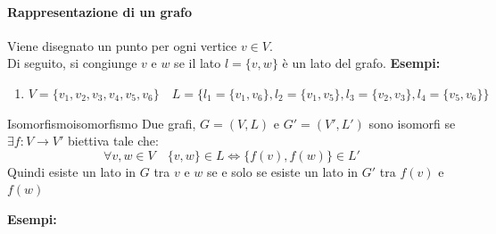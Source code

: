 \documentclass[12pt, letterpaper]{report}
\newcounter{definition}
\newcommand{\nmu}{}
\begin{document}
   	\paragraph{Rappresentazione di un grafo}
   	Viene disegnato un punto per ogni vertice $v \in V$. \\
   	Di seguito, si congiunge $v$ e $w$ se il lato $l = \{v,w\}$ è un lato del grafo.
   	\textbf{Esempi:}
   	\begin{enumerate}
   		\item $V = \{v_1, v_2,v_3, v_4, v_5, v_6\} \quad L=\{l_1=\{v_1, v_6\}, l_2=\{v_1,v_5\}, l_3 = \{v_2,v_3\}, l_4=\{v_5,v_6\}\}$ \\
   	\end{enumerate}
   	\begin{definition}{\nmu Isomorfismo}{isomorfismo}
   		Due grafi, $G=(V,L)$ e $G'=(V', L')$ sono isomorfi se $\exists f: V \to V'$ biettiva tale che:
   		\[
   		\forall v,w \in V \quad \{v,w\} \in L \iff \{f(v), f(w)\} \in L'
   		\]
   	Quindi esiste un lato in $G$ tra $v$ e $w$ se e solo se esiste un lato in $G'$ tra $f(v)$ e $f(w)$
   	\end{definition}
   	\textbf{Esempi:}
\end{document}
